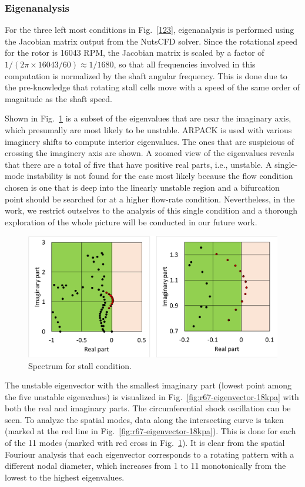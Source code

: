 \documentclass[journal,final]{new-aiaa}
\begin{document}
\subsubsection{Eigenanalysis}
For the three left most conditions in Fig.~\ref{123},
eigenanalysis is performed using the Jacobian matrix
output from the NutsCFD solver.
Since the rotational speed for the rotor is 16043 RPM, the Jacobian
matrix is scaled by a factor of $1/(2\pi \times 16043 / 60)\approx 1/1680$,
so that all frequencies involved in this computation is normalized by the
shaft angular frequency. This is done due to the pre-knowledge that
rotating stall cells move with a speed of the same order of magnitude
as the shaft speed.


Shown in Fig.~\ref{fig:r67-eigenvalue-18kpa} is a subset of the eigenvalues
that are near the imaginary axis, which presumally are most likely to
be unstable. ARPACK is used with various imaginery shifts to compute
interior eigenvalues. The ones that are suspicious of crossing the
imaginery axis are shown. A zoomed view of the eigenvalues reveals
that there are a total of five that have positive real parts, i.e., unstable.
A single-mode instability is not found for the case most likely because
the flow condition chosen is one that is deep into the linearly unstable
region and a bifurcation point should be searched for at a higher flow-rate
condition. Nevertheless, in the work, we restrict outselves to the analysis
of this single condition and a thorough exploration of the whole picture will
be conducted in our future work.


\begin{figure}[htb]
	\centering   
	\includegraphics[width=.7\textwidth]{pic/rotor67-18kpa-spectrum.png}	
	\caption{Spectrum for stall condition.}
	\label{fig:r67-eigenvalue-18kpa}
\end{figure}

The unstable eigenvector with the smallest imaginary part (lowest point among the
five unstable eigenvalues) is visualized in Fig.~\ref{fig:r67-eigenvector-18kpa} with
both the real and imaginary parts. The circumferential shock
oscillation can be seen. To analyze the spatial modes, data along
the intersecting curve is taken (marked at the red line in
Fig.~\ref{fig:r67-eigenvector-18kpa}). This is done for
each of the 11 modes (marked with red cross in Fig.~\ref{fig:r67-eigenvalue-18kpa}).
It is clear from the spatial Fouriour analysis
that each eigenvector corresponds to a rotating pattern with a different
nodal diameter, which increases from 1 to 11 monotonically from the lowest
to the highest eigenvalues.
\end{document}
